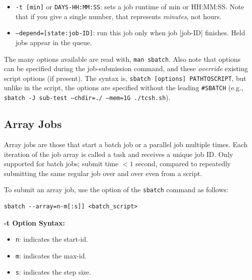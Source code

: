 \begin{itemize}
\item
\texttt{-t [min]} or \texttt{DAYS-HH:MM:SS}: sets a job runtime of min or HH:MM:SS. Note 
that if you give a single number, that represents \emph{minutes}, not hours. 

\item
\texttt{--depend=[state:job-ID]}: run this job only when job [job-ID] finishes. Held jobs appear in the queue. 

\end{itemize}

The many  options available are read with, \texttt{man sbatch}. Also 
note that  options can be specified during the job-submission 
command, and these \emph{override} existing script options (if present). The 
syntax is, \texttt{sbatch [options] PATHTOSCRIPT}, but unlike in the script, 
the options are specified without the leading \verb+#SBATCH+
(e.g., \texttt{sbatch -J sub-test --chdir=./ --mem=1G ./tcsh.sh}).


\subsection{Array Jobs}
\label{sect:array-jobs}

Array jobs are those that start a batch job or a parallel job multiple times. 
Each iteration of the job array is called a task and receives a unique job ID.
Only supported for batch jobs; submit time $< 1$ second, compared to repeatedly
submitting the same regular job over and over even from a script.

To submit an array job, use the  option of the \texttt{sbatch} 
command as follows:

\begin{verbatim}
sbatch --array=n-m[:s]] <batch_script>
\end{verbatim}

\textbf{-t Option Syntax:}
\begin{itemize}
\item
\texttt{n}: indicates the start-id.
\item
\texttt{m}: indicates the max-id.
\item
\texttt{s}: indicates the step size.
\end{itemize}

